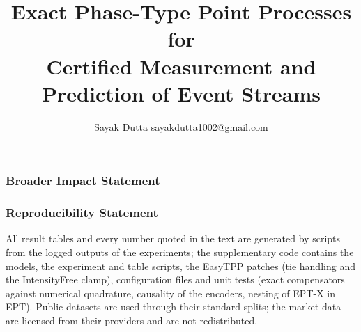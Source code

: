 \documentclass[10pt]{article}
\title{Exact Phase-Type Point Processes for\\
Certified Measurement and Prediction of Event Streams}
\author{\name Sayak Dutta \email sayakdutta1002@gmail.com}
\theoremstyle{remark}
\newcommand{\codename}{supplementary code}  %
\begin{document}
\maketitle

\begin{abstract}

\end{abstract}










\subsubsection*{Broader Impact Statement}


\subsubsection*{Reproducibility Statement}
All result tables and every number quoted in the text are generated by scripts from the logged
outputs of the experiments; the \codename{} contains the models, the experiment and
table scripts, the EasyTPP patches (tie handling and the IntensityFree clamp), configuration
files and unit tests (exact compensators against numerical quadrature, causality of the
encoders, nesting of EPT-X in EPT). Public datasets are used through their standard splits;
the market data are licensed from their providers and are not redistributed.




\appendix

\end{document}
